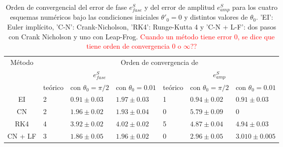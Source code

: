 \documentclass[aps,prb,twocolumn,superscriptaddress,floatfix,longbibliography]{revtex4-2}
\newcounter{para}
\begin{document}
\twocolumngrid



\onecolumngrid


\begin{table}[]
  \begin{tabular}{|c|llllll|}
  \hline
  \multirow{3}{*}{Método} &
    \multicolumn{6}{c|}{Orden de convergencia de} \\ \cline{2-7} 
   &
    \multicolumn{3}{c|}{$e^S_{fase}$} &
    \multicolumn{3}{c|}{$e^S_{amp}$} \\ \cline{2-7} 
   &
    \multicolumn{1}{c|}{teórico} &
    \multicolumn{1}{c|}{con $\theta_0 = \pi/2$} &
    \multicolumn{1}{c|}{con $\theta_0 = 0.01$} &
    \multicolumn{1}{c|}{teórico} &
    \multicolumn{1}{c|}{con $\theta_0 = \pi/2$} &
    \multicolumn{1}{c|}{con $\theta_0 = 0.01$} \\ \hline
  EI &
    \multicolumn{1}{l|}{2} &
    \multicolumn{1}{l|}{$0.91 \pm 0.03$} &
    \multicolumn{1}{l|}{$1.97 \pm 0.03$} &
    \multicolumn{1}{l|}{1} &
    \multicolumn{1}{l|}{$0.94 \pm 0.02$} &
    $0.91 \pm 0.03$ \\ \hline
  CN &
    \multicolumn{1}{l|}{2} &
    \multicolumn{1}{l|}{$1.96 \pm 0.02$} &
    \multicolumn{1}{l|}{$1.93 \pm 0.04$} &
    \multicolumn{1}{l|}{0} &
    \multicolumn{1}{l|}{$5.79 \pm 0.09$} &
    0 \\ \hline
  RK4 &
    \multicolumn{1}{l|}{4} &
    \multicolumn{1}{l|}{$3.92 \pm 0.02$} &
    \multicolumn{1}{l|}{$4.02 \pm 0.02$} &
    \multicolumn{1}{l|}{5} &
    \multicolumn{1}{l|}{$4.87 \pm 0.04$} &
    $4.94 \pm 0.03$ \\ \hline
  CN + LF &
    \multicolumn{1}{l|}{3} &
    \multicolumn{1}{l|}{$1.86 \pm 0.05$} &
    \multicolumn{1}{l|}{$1.96 \pm 0.02$} &
    \multicolumn{1}{l|}{0} &
    \multicolumn{1}{l|}{$2.96 \pm 0.05$} &
    $3.010 \pm 0.005$ \\ \hline
  \end{tabular}
  \caption{\label{tabla:simple_errores} Orden de convergencial del error de fase $e^S_{fase}$ y del error de amplitud $e^S_{amp}$ para los cuatro esquemas numéricos bajo las condiciones iniciales $\theta'_0 = 0$ y distintos valores de $\theta_0$. 'EI': Euler implícito, 'C-N': Crank-Nicholson, 'RK4': Runge-Kutta 4 y 'C-N + L-F': dos pasos con Crank Nicholson y uno con Leap-Frog. \textcolor{red}{Cuando un método tiene error 0, se dice que tiene orden de convergencia 0 o $\infty$??}}
  \end{table}
\end{document}

